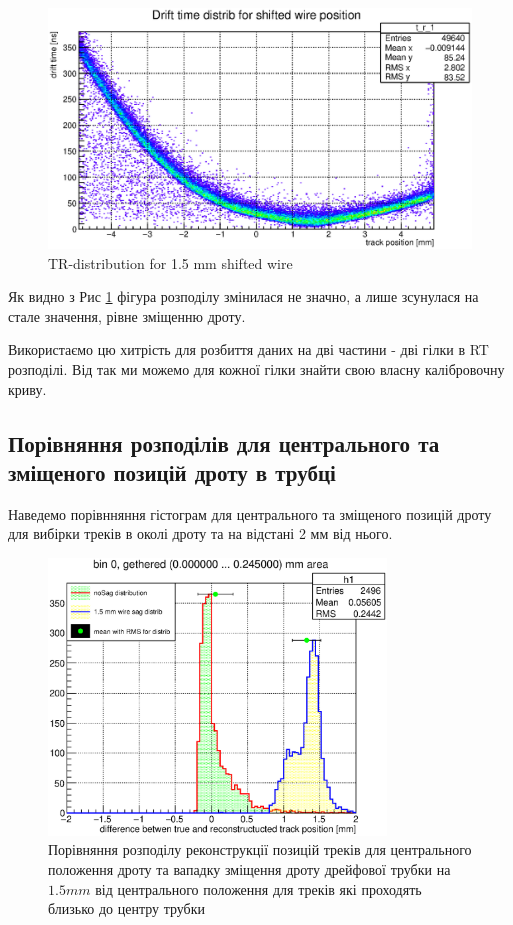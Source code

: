 \documentclass[]{article}
\begin{document}
	\begin{figure}
		\centering
		\includegraphics[width = \textwidth]{tr_distr_15.eps}
		\caption{TR-distribution for 1.5 mm shifted wire}
		\label{fig:tr_distr_15}
	\end{figure}
	
	Як видно з Рис \ref{fig:tr_distr_15} фігура розподілу змінилася не значно, а лише зсунулася на стале значення, рівне зміщенню дроту.
	
	Використаємо цю хитрість для розбиття даних на дві частини - дві гілки в RT розподілі. Від так ми можемо для  кожної гілки знайти свою власну калібровочну криву.
	
	\subsection{ Порівняння розподілів для центрального та зміщеного позицій дроту в трубці}	
	Наведемо порівнняння гістограм для центрального та зміщеного позицій дроту для вибірки треків в околі дроту та на відстані 2 мм від нього.
	
	\begin{figure}[h!]
	\includegraphics[width=0.8\textwidth]{bin0_0mm.eps}
	\centering
	\caption{ Порівняння розподілу реконструкції позицій треків для центрального положення дроту та вападку зміщення дроту дрейфової трубки на $1.5 mm$ від центрального положення для треків які проходять близько до центру трубки}
	\end{figure}
	
\end{document}
